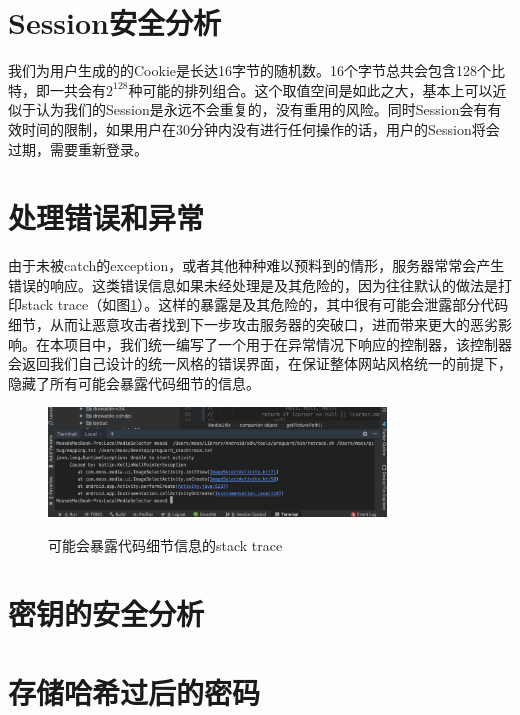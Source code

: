 \section{Session安全分析}\label{sec:sessionS}

我们为用户生成的的Cookie是长达16字节的随机数。16个字节总共会包含128个比特，即一共会有$2^{128}$种可能的排列组合。这个取值空间是如此之大，基本上可以近似于认为我们的Session是永远不会重复的，没有重用的风险。同时Session会有有效时间的限制，如果用户在30分钟内没有进行任何操作的话，用户的Session将会过期，需要重新登录。

\section{处理错误和异常}

由于未被catch的exception，或者其他种种难以预料到的情形，服务器常常会产生错误的响应。这类错误信息如果未经处理是及其危险的，因为往往默认的做法是打印stack trace（如图\ref{fig:stacktrace}）。这样的暴露是及其危险的，其中很有可能会泄露部分代码细节，从而让恶意攻击者找到下一步攻击服务器的突破口，进而带来更大的恶劣影响。在本项目中，我们统一编写了一个用于在异常情况下响应的控制器，该控制器会返回我们自己设计的统一风格的错误界面，在保证整体网站风格统一的前提下，隐藏了所有可能会暴露代码细节的信息。

\begin{figure}[!htb]
	\centering
	\includegraphics[width=0.8\textwidth]
	{figures/stacktrace.jpg}\\
	\caption{可能会暴露代码细节信息的stack trace}
	\label{fig:stacktrace}
\end{figure}

\section{密钥的安全分析}\label{sec:keyS}

\section{存储哈希过后的密码}\label{sec:hashpassword}
